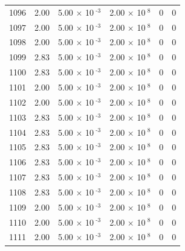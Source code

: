 \documentclass[a4paper,11pt]{article}
\begin{document}
\begin{center}
\begin{longtable}{|R{1.5cm}|R{2.4cm}|R{2.4cm}|R{2.4cm}|R{2.4cm}|R{2.4cm}|}
 1096 &   2.00  &         5.00 $\times$ 10$^{\text{          -3}}$  &         2.00 $\times$ 10$^{\text{           8}}$  & 0  & 0 \\
 1097 &   2.00  &         5.00 $\times$ 10$^{\text{          -3}}$  &         2.00 $\times$ 10$^{\text{           8}}$  & 0  & 0 \\
 1098 &   2.00  &         5.00 $\times$ 10$^{\text{          -3}}$  &         2.00 $\times$ 10$^{\text{           8}}$  & 0  & 0 \\
 1099 &   2.83  &         5.00 $\times$ 10$^{\text{          -3}}$  &         2.00 $\times$ 10$^{\text{           8}}$  & 0  & 0 \\
 1100 &   2.83  &         5.00 $\times$ 10$^{\text{          -3}}$  &         2.00 $\times$ 10$^{\text{           8}}$  & 0  & 0 \\
 1101 &   2.00  &         5.00 $\times$ 10$^{\text{          -3}}$  &         2.00 $\times$ 10$^{\text{           8}}$  & 0  & 0 \\
 1102 &   2.00  &         5.00 $\times$ 10$^{\text{          -3}}$  &         2.00 $\times$ 10$^{\text{           8}}$  & 0  & 0 \\
 1103 &   2.83  &         5.00 $\times$ 10$^{\text{          -3}}$  &         2.00 $\times$ 10$^{\text{           8}}$  & 0  & 0 \\
 1104 &   2.83  &         5.00 $\times$ 10$^{\text{          -3}}$  &         2.00 $\times$ 10$^{\text{           8}}$  & 0  & 0 \\
 1105 &   2.83  &         5.00 $\times$ 10$^{\text{          -3}}$  &         2.00 $\times$ 10$^{\text{           8}}$  & 0  & 0 \\
 1106 &   2.83  &         5.00 $\times$ 10$^{\text{          -3}}$  &         2.00 $\times$ 10$^{\text{           8}}$  & 0  & 0 \\
 1107 &   2.83  &         5.00 $\times$ 10$^{\text{          -3}}$  &         2.00 $\times$ 10$^{\text{           8}}$  & 0  & 0 \\
 1108 &   2.83  &         5.00 $\times$ 10$^{\text{          -3}}$  &         2.00 $\times$ 10$^{\text{           8}}$  & 0  & 0 \\
 1109 &   2.00  &         5.00 $\times$ 10$^{\text{          -3}}$  &         2.00 $\times$ 10$^{\text{           8}}$  & 0  & 0 \\
 1110 &   2.00  &         5.00 $\times$ 10$^{\text{          -3}}$  &         2.00 $\times$ 10$^{\text{           8}}$  & 0  & 0 \\
 1111 &   2.00  &         5.00 $\times$ 10$^{\text{          -3}}$  &         2.00 $\times$ 10$^{\text{           8}}$  & 0  & 0 \\

\end{longtable}
\end{center}
\end{document}
